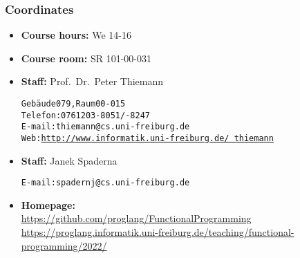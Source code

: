 \documentclass{beamer}
\begin{document}
\begin{frame}
  \titlepage
\end{frame}

\begin{frame}[fragile]
  \frametitle{Coordinates}
  \begin{itemize}
  \item \textbf{Course hours:}  We 14-16
  \item \textbf{Course room:} SR 101-00-031
  \item \textbf{Staff:} Prof.\ Dr.\ Peter Thiemann\\
\begin{alltt}
Gebäude 079, Raum 00-015
Telefon: 0761 203 -8051/-8247
E-mail: thiemann@cs.uni-freiburg.de
Web: \href{http://www.informatik.uni-freiburg.de/~thiemann}{http://www.informatik.uni-freiburg.de/~thiemann}
\end{alltt}
\item  \textbf{Staff:} Janek Spaderna\\
\begin{alltt}
E-mail: spadernj@cs.uni-freiburg.de
\end{alltt}
  \item\textbf{Homepage:}\\ \footnotesize
    \href{https://github.com/proglang/FunctionalProgramming}{
      https://github.com/proglang/FunctionalProgramming}
    \\
    \href{https://proglang.informatik.uni-freiburg.de/teaching/functional-programming/2022/}{
      https://proglang.informatik.uni-freiburg.de/teaching/functional-programming/2022/}
  \end{itemize}
\end{frame}
\end{document}

